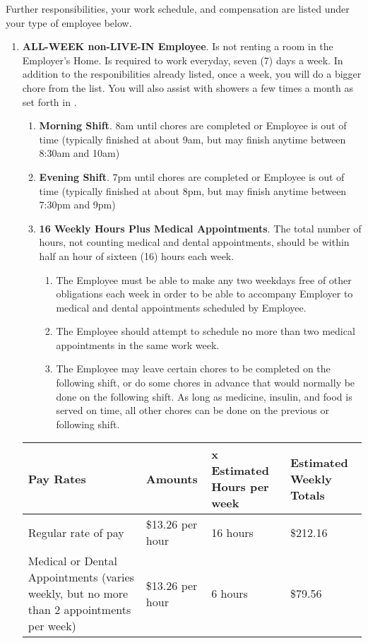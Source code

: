 \documentclass[]{article}
\newcommand{\allweek}{ALL-WEEK non-LIVE-IN Employee}
\begin{document}
Further responsibilities, your work schedule, and compensation are listed under your type of employee below.
\begin{enumerate}
	\item \textbf{\allweek{}}. Is not renting a room in the Employer's Home. Is required to work everyday, seven (7) days a week. In addition to the responibilities already listed, once a week, you will do a bigger chore from the \bigchores{} list. You will also assist with showers a few times a month as set forth in \shower{}. 
		\begin{enumerate}
			\item \textbf{Morning Shift}. 8am until chores are completed or Employee is out of time (typically finished at about 9am, but may finish anytime between 8:30am and 10am)
			\item \textbf{Evening Shift}. 7pm until chores are completed or Employee is out of time (typically finished at about 8pm, but may finish anytime between 7:30pm and 9pm)
			\item \textbf{16 Weekly Hours Plus Medical Appointments}. The total number of hours, not counting medical and dental appointments, should be within half an hour of sixteen (16) hours each week. 
				\begin{enumerate}
					\item The Employee must be able to make any two weekdays free of other obligations each week in order to be able to accompany Employer to medical and dental appointments scheduled by Employee.
					\item The Employee should attempt to schedule no more than two medical appointments in the same work week.
					\item The Employee may leave certain chores to be completed on the following shift, or do some chores in advance that would normally be done on the following shift. As long as medicine, insulin, and food is served on time, all other chores can be done on the previous or following shift.
				\end{enumerate}
		\end{enumerate}
		\begin{tabular}{|p{}|l|l|p{}|}
			\hline
			Pay Rates & Amounts & x Estimated Hours per week & Estimated Weekly Totals\\ \hline
			Regular rate of pay & \$13.26 per hour & 16 hours & \$212.16\\ \hline
			Medical or Dental Appointments (varies weekly, but no more than 2 appointments per week) & \$13.26 per hour & 6 hours & \$79.56\\ \hline

\end{tabular}
\end{enumerate}
\end{document}
